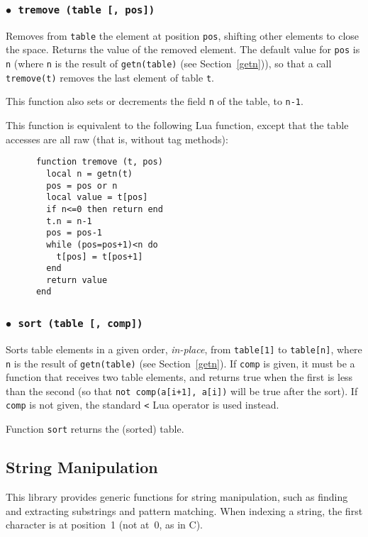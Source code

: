 \documentclass[11pt]{article}
\newcommand{\See}[1]{Section~\ref{#1}}
\newcommand{\see}[1]{(see \See{#1})}
\newcommand{\T}[1]{{\tt #1}}
\newcommand{\Deffunc}[1]{\index{#1}}
\newcommand{\ff}{$\bullet$\ }
\begin{document}
\subsubsection*{\ff \T{tremove (table [, pos])}}\Deffunc{tremove}

Removes from \verb|table| the element at position \verb|pos|,
shifting other elements to close the space.
Returns the value of the removed element.
The default value for \verb|pos| is \verb|n|
(where \verb|n| is the result of \verb|getn(table)| \see{getn}),
so that a call \verb|tremove(t)| removes the last element
of table \verb|t|.

This function also sets or decrements the field \verb|n| of the table,
to \verb|n-1|.

This function is equivalent to the following Lua function,
except that the table accesses are all raw (that is, without tag methods):
\begin{verbatim}
      function tremove (t, pos)
        local n = getn(t)
        pos = pos or n
        local value = t[pos]
        if n<=0 then return end
        t.n = n-1
        pos = pos-1
        while (pos=pos+1)<n do
          t[pos] = t[pos+1]
        end
        return value
      end
\end{verbatim}

\subsubsection*{\ff \T{sort (table [, comp])}}\Deffunc{sort}
Sorts table elements in a given order, \emph{in-place},
from \verb|table[1]| to \verb|table[n]|,
where \verb|n| is the result of \verb|getn(table)| \see{getn}.
If \verb|comp| is given,
it must be a function that receives two table elements,
and returns true when the first is less than the second
(so that \verb|not comp(a[i+1], a[i])| will be true after the sort).
If \verb|comp| is not given,
the standard \verb|<| Lua operator is used instead.

Function \verb|sort| returns the (sorted) table.


\subsection{String Manipulation}
This library provides generic functions for string manipulation,
such as finding and extracting substrings and pattern matching.
When indexing a string, the first character is at position~1
(not at~0, as in C).
\end{document}
